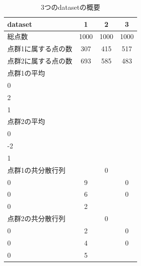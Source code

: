 \documentclass[class=jsarticle, crop=false, dvipdfmx, fleqn]{standalone}
\begin{document}
\begin{table}
    \centering
    \caption{3つのdatasetの概要}
    \begin{tabular}{lccc} \hline
        dataset & 1 & 2 & 3 \\ \hline
        総点数 & 1000 & 1000 & 1000 \\ \hline
        点群1に属する点の数 & 307 & 415 & 517 \\ \hline
        点群2に属する点の数 & 693 & 585 & 483 \\ \hline
        点群1の平均
            & \(\begin{bmatrix} 2 \\ 0 \end{bmatrix}\)
            & \(\begin{bmatrix} 2 \\ 2 \end{bmatrix}\)
            & \(\begin{bmatrix} 1 \\ 1 \end{bmatrix}\) \\ \hline
        点群2の平均
            & \(\begin{bmatrix} -2 \\ 0 \end{bmatrix}\)
            & \(\begin{bmatrix} -2 \\ -2 \end{bmatrix}\)
            & \(\begin{bmatrix} 1 \\ 1 \end{bmatrix}\) \\ \hline
        点群1の共分散行列
            & \(\begin{bmatrix} 1 & 0 \\ 0 & 9 \end{bmatrix}\)
            & \(\begin{bmatrix} 5 & 0 \\ 0 & 6 \end{bmatrix}\)
            & \(\begin{bmatrix} 1 & 0 \\ 0 & 2 \end{bmatrix}\) \\ \hline
        点群2の共分散行列
            & \(\begin{bmatrix} 1 & 0 \\ 0 & 2 \end{bmatrix}\)
            & \(\begin{bmatrix} 6 & 0 \\ 0 & 4 \end{bmatrix}\)
            & \(\begin{bmatrix} 8 & 0 \\ 0 & 5 \end{bmatrix}\) \\ \hline
    \end{tabular}
    \label{tab:datasets}
\end{table}
\end{document}
